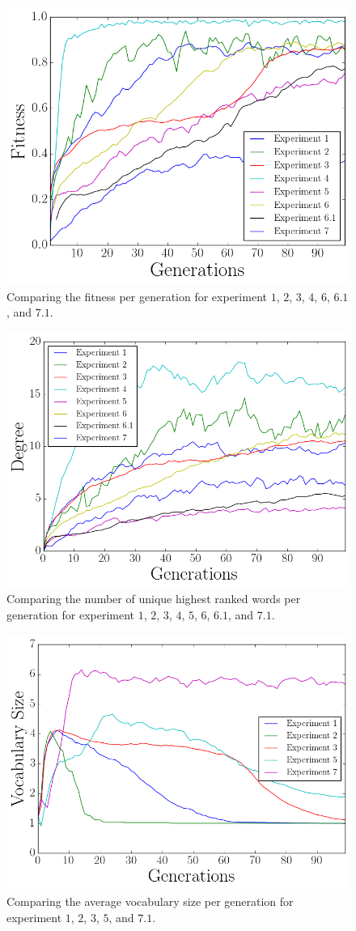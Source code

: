 \begin{figure}
    \centering
    \includegraphics[width=0.7\linewidth]{fig/Discussion/FitnessComparison}
    \caption{Comparing the fitness per generation for experiment $1$, $2$, $3$, $4$, $6$, $6.1$, and $7.1$.}
    \label{fig:fitComp}
\end{figure}
\begin{figure}
    \centering
    \includegraphics[width=0.7\linewidth]{fig/Discussion/DegreeComparison}
    \caption{Comparing the number of unique highest ranked words per generation for experiment $1$, $2$, $3$, $4$, $5$, $6$, $6.1$, and $7.1$.}
    \label{fig:degreeComp}
\end{figure}
\begin{figure}
    \centering
    \includegraphics[width=0.7\linewidth]{fig/Discussion/VocabularyComparison}
    \caption{Comparing the average vocabulary size per generation for experiment $1$, $2$, $3$, $5$, and $7.1$.}
    \label{fig:VocComp}
\end{figure}
